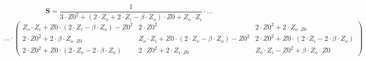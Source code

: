 \[ \mathbf{S}=\frac{1}{3\cdot Z0^2+\left(2\cdot Z_o+2\cdot
Z_i-\beta\cdot Z_o\right)\cdot Z0+Z_o\cdot Z_i}\cdot\ldots \]
\[ \ldots\cdot \left(\begin{smallmatrix} Z_o\cdot Z_i+Z0\cdot
\left(2\cdot Z_i-\beta\cdot Z_o\right)-Z0^2 & 2\cdot Z0^2 & 2\cdot
Z0^2+2\cdot Z_{o\cdot Z0} \\ 2\cdot Z0^2+2\cdot \beta\cdot Z_{o\cdot
Z0} & Z_o\cdot Z_i+Z0\cdot \left(2\cdot Z_o-\beta\cdot Z_o\right)-Z0^2
& 2\cdot Z0^2+Z0\cdot \left(2\cdot Z_i-2\cdot \beta\cdot Z_o\right) \\
2\cdot Z0^2+Z0\cdot \left(2\cdot Z_o-2\cdot \beta\cdot Z_o\right) &
2\cdot Z0^2+2\cdot Z_{i\cdot Z0} & Z_o\cdot Z_i-Z0^2+\beta\cdot
Z_o\cdot Z0 \end{smallmatrix}\right) \]
